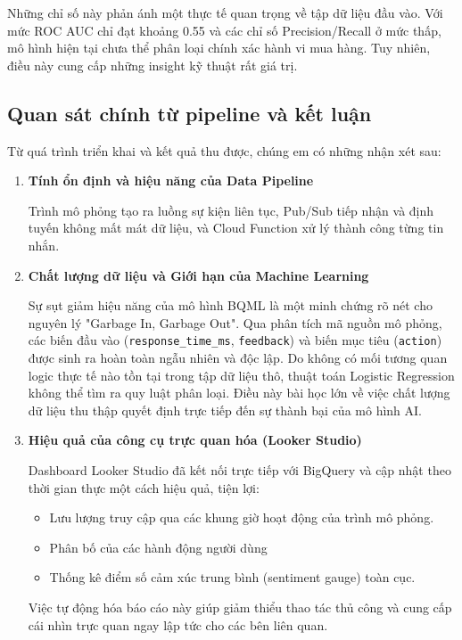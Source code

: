 Những chỉ số này phản ánh một thực tế quan trọng về tập dữ liệu đầu vào. Với mức ROC AUC chỉ đạt khoảng 0.55 và các chỉ số Precision/Recall ở mức thấp, mô hình hiện tại chưa thể phân loại chính xác hành vi mua hàng. Tuy nhiên, điều này cung cấp những insight kỹ thuật rất giá trị.

\subsection{Quan sát chính từ pipeline và kết luận}

Từ quá trình triển khai và kết quả thu được, chúng em có những nhận xét sau:

\begin{enumerate}
    \item \textbf{Tính ổn định và hiệu năng của Data Pipeline}
    
    Trình mô phỏng tạo ra luồng sự kiện liên tục, Pub/Sub tiếp nhận và định tuyến không mất mát dữ liệu, và Cloud Function xử lý thành công từng tin nhắn.
    
    \item \textbf{Chất lượng dữ liệu và Giới hạn của Machine Learning}
    
    Sự sụt giảm hiệu năng của mô hình BQML là một minh chứng rõ nét cho nguyên lý "Garbage In, Garbage Out". Qua phân tích mã nguồn mô phỏng, các biến đầu vào (\texttt{response\_time\_ms}, \texttt{feedback}) và biến mục tiêu (\texttt{action}) được sinh ra hoàn toàn ngẫu nhiên và độc lập. Do không có mối tương quan logic thực tế nào tồn tại trong tập dữ liệu thô, thuật toán Logistic Regression không thể tìm ra quy luật phân loại. Điều này bài học lớn về việc chất lượng dữ liệu thu thập quyết định trực tiếp đến sự thành bại của mô hình AI.
    
    \item \textbf{Hiệu quả của công cụ trực quan hóa (Looker Studio)}
    
    Dashboard Looker Studio đã kết nối trực tiếp với BigQuery và cập nhật theo thời gian thực một cách hiệu quả, tiện lợi:
    \begin{itemize}
        \item Lưu lượng truy cập qua các khung giờ hoạt động của trình mô phỏng.
        \item Phân bố  của các hành động người dùng 
        \item Thống kê điểm số cảm xúc trung bình (sentiment gauge) toàn cục.
    \end{itemize}
    
    Việc tự động hóa báo cáo này giúp giảm thiểu thao tác thủ công và cung cấp cái nhìn trực quan ngay lập tức cho các bên liên quan.
\end{enumerate}

